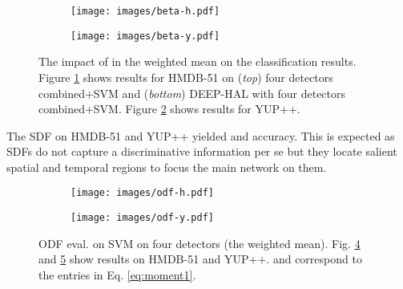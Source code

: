 \begin{figure}[b]\centering \vspace{-0.1cm}
\begin{subfigure}[b]{0.495\linewidth}
\texttt{[image: images/beta-h.pdf]}\vspace{-0.2cm}
\caption{\label{fig:beta-h}}
\vspace{-0.2cm}
\end{subfigure}
\begin{subfigure}[b]{0.495\linewidth}
\texttt{[image: images/beta-y.pdf]}\vspace{-0.2cm}
\caption{\label{fig:beta-y}}
\vspace{-0.2cm}
\end{subfigure}
\caption{The impact of  in the weighted mean on the classification results. Figure \ref{fig:beta-h} shows results for HMDB-51 on ({\em top}) four detectors combined+SVM and ({\em bottom}) DEEP-HAL with four detectors combined+SVM. Figure \ref{fig:beta-y} shows results for YUP++.}
\vspace{-0.3cm}
\label{fig:beta}
\end{figure}








\vspace{0.05cm}
 The SDF on HMDB-51 and YUP++ yielded  and  accuracy. This is expected as SDFs do not capture a discriminative information per se but they locate salient spatial and temporal regions to focus the main network on them.


\begin{figure}[b]\centering \vspace{-0.1cm}
\begin{subfigure}[b]{0.495\linewidth}
\texttt{[image: images/odf-h.pdf]}\vspace{-0.2cm}
\caption{\label{fig:odf-h}}
\vspace{-0.2cm}
\end{subfigure}
\begin{subfigure}[b]{0.495\linewidth}
\texttt{[image: images/odf-y.pdf]}\vspace{-0.2cm}
\caption{\label{fig:odf-y}}
\vspace{-0.2cm}
\end{subfigure}
\caption{ODF eval. on SVM on four detectors (the weighted mean). Fig. \ref{fig:odf-h} and \ref{fig:odf-y}  show results on HMDB-51 and YUP++.  and  correspond to the  entries in Eq. \eqref{eq:moment1}. 
}
\label{fig:odf}
\end{figure}

